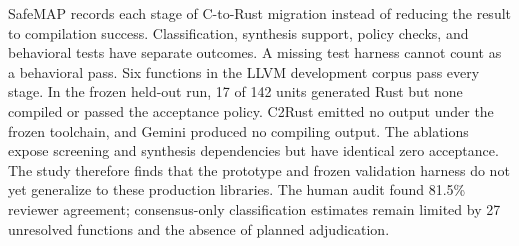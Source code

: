 \documentclass[conference]{IEEEtran}
\newcommand{\tool}{SafeMAP\xspace}
\begin{document}
\tool records each stage of C-to-Rust migration instead of reducing the result
to compilation success. Classification, synthesis support, policy checks, and
behavioral tests have separate outcomes. A missing test harness cannot count as
a behavioral pass. Six functions in the LLVM development corpus pass every
stage. In the frozen held-out run, 17 of 142 units generated Rust but none
compiled or passed the acceptance policy. C2Rust emitted no output under the
frozen toolchain, and Gemini produced no compiling output. The ablations expose
screening and synthesis dependencies but have identical zero acceptance. The
study therefore finds that the prototype and frozen validation harness do not
yet generalize to these production libraries. The human audit found 81.5\%
reviewer agreement; consensus-only classification estimates remain limited by
27 unresolved functions and the absence of planned adjudication.



\end{document}
